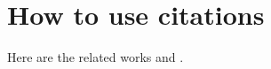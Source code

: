 \chapter{How to use citations} \label{labelIfyouWant}

Here are the related works\cite{Gallager:1962,Mackay:1999,IEEE 802.11an,IEEE802.15.3c} and \cite{M.P.C.Fossorier}.